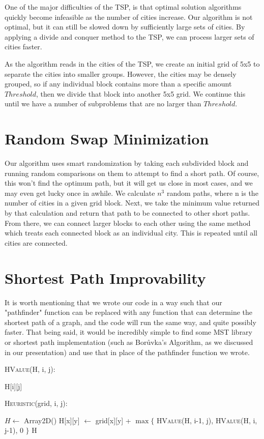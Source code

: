 \documentclass[12pt,letterpaper]{article}
\begin{document}
One of the major difficulties of the TSP, is that optimal solution algorithms quickly become infeasible as the number of cities increase. Our algorithm is not optimal, but it can still be slowed down by sufficiently large sets of cities. By applying a divide and conquer method to the TSP, we can process larger sets of cities faster.

As the algorithm reads in the cities of the TSP, we create an initial grid of 5x5 to separate the cities into smaller groups. However, the cities may be densely grouped, so if any individual block contains more than a specific amount $Threshold$, then we divide that block into another 5x5 grid. We continue this until we have a number of subproblems that are no larger than $Threshold$. 

\section*{Random Swap Minimization}
Our algorithm uses smart randomization by taking each subdivided block and running random comparisons on them to attempt to find a short path. Of course, this won't find the optimum path, but it will get us close in most cases, and we may even get lucky once in awhile. We calculate $n^3$ random paths, where n is the number of cities in a given grid block. Next, we take the minimum value returned by that calculation and return that path to be connected to other short paths. From there, we can connect larger blocks to each other using the same method which treats each connected block as an individual city. This is repeated until all cities are connected.

\section*{Shortest Path Improvability}
It is worth mentioning that we wrote our code in a way such that our "pathfinder" function can be replaced with any function that can determine the shortest path of a graph, and the code will run the same way, and quite possibly faster. That being said, it would be incredibly simple to find some MST library or shortest path implementation (such as Bor\r{u}vka's Algorithm, as we discussed in our presentation) and use that in place of the pathfinder function we wrote.

\textsc{HValue}(H, i, j):
\begin{algorithmic}
    \State {}
\Else
    \State \Return H[i][j]
\EndIf
\end{algorithmic}

\textsc{Heuristic}(grid, i, j):
\begin{algorithmic}
\State $H \gets$ Array2D()
        \State H[x][y] $\gets$ grid[x][y] + $\max \{$ \textsc{HValue}(H, i-1, j), \textsc{HValue}(H, i, j-1), 0  $\}$
    \EndFor
\EndFor
\State \Return H
\end{algorithmic}

\newpage
\end{document}
